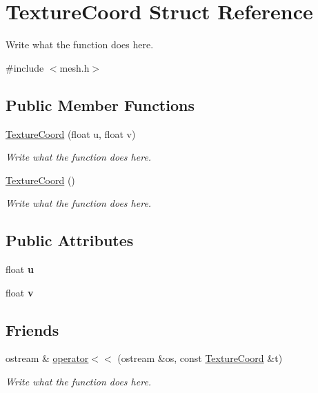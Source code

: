 \hypertarget{structTextureCoord}{\section{Texture\+Coord Struct Reference}
\label{structTextureCoord}
}


Write what the function does here.  




{\ttfamily \#include $<$mesh.\+h$>$}

\subsection*{Public Member Functions}
\begin{DoxyCompactItemize}
\item 
\hyperlink{structTextureCoord_a244f496ea94cf6a50be632a3ef7d36d2}{Texture\+Coord} (float u, float v)
\begin{DoxyCompactList}\small\item\em Write what the function does here. \end{DoxyCompactList}\item 
\hyperlink{structTextureCoord_ac86816d32178ab04d7c4456613eb9eca}{Texture\+Coord} ()
\begin{DoxyCompactList}\small\item\em Write what the function does here. \end{DoxyCompactList}\end{DoxyCompactItemize}
\subsection*{Public Attributes}
\begin{DoxyCompactItemize}
\item 
\hypertarget{structTextureCoord_ae64022a50d7a8c1522f1f07631135804}{float {\bfseries u}}\label{structTextureCoord_ae64022a50d7a8c1522f1f07631135804}

\item 
\hypertarget{structTextureCoord_af26c9cf30246ac6451d981bb836ae4b1}{float {\bfseries v}}\label{structTextureCoord_af26c9cf30246ac6451d981bb836ae4b1}

\end{DoxyCompactItemize}
\subsection*{Friends}
\begin{DoxyCompactItemize}
\item 
ostream \& \hyperlink{structTextureCoord_a30143be17ec2f3bbe4df4424e4ac8fb6}{operator$<$$<$} (ostream \&os, const \hyperlink{structTextureCoord}{Texture\+Coord} \&t)
\begin{DoxyCompactList}\small\item\em Write what the function does here. \end{DoxyCompactList}\end{DoxyCompactItemize}


